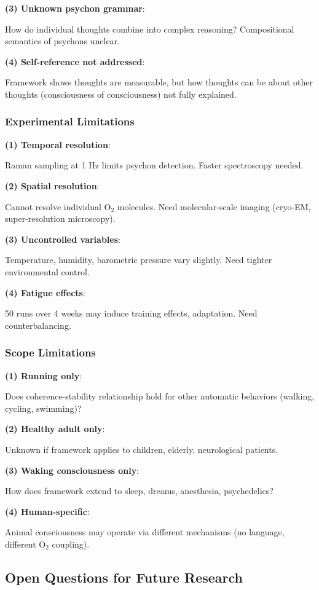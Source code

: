 \documentclass[11pt,onecolumn]{article}
\begin{document}
\textbf{(3) Unknown psychon grammar}:

How do individual thoughts combine into complex reasoning? Compositional semantics of psychons unclear.

\textbf{(4) Self-reference not addressed}:

Framework shows thoughts are measurable, but how thoughts can be about other thoughts (consciousness of consciousness) not fully explained.

\subsubsection{Experimental Limitations}

\textbf{(1) Temporal resolution}:

Raman sampling at 1 Hz limits psychon detection. Faster spectroscopy needed.

\textbf{(2) Spatial resolution}:

Cannot resolve individual O$_2$ molecules. Need molecular-scale imaging (cryo-EM, super-resolution microscopy).

\textbf{(3) Uncontrolled variables}:

Temperature, humidity, barometric pressure vary slightly. Need tighter environmental control.

\textbf{(4) Fatigue effects}:

50 runs over 4 weeks may induce training effects, adaptation. Need counterbalancing.

\subsubsection{Scope Limitations}

\textbf{(1) Running only}:

Does coherence-stability relationship hold for other automatic behaviors (walking, cycling, swimming)?

\textbf{(2) Healthy adult only}:

Unknown if framework applies to children, elderly, neurological patients.

\textbf{(3) Waking consciousness only}:

How does framework extend to sleep, dreams, anesthesia, psychedelics?

\textbf{(4) Human-specific}:

Animal consciousness may operate via different mechanisms (no language, different O$_2$ coupling).

\subsection{Open Questions for Future Research}
\end{document}
